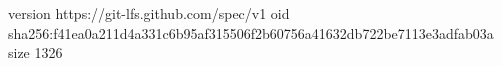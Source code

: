 version https://git-lfs.github.com/spec/v1
oid sha256:f41ea0a211d4a331c6b95af315506f2b60756a41632db722be7113e3adfab03a
size 1326
